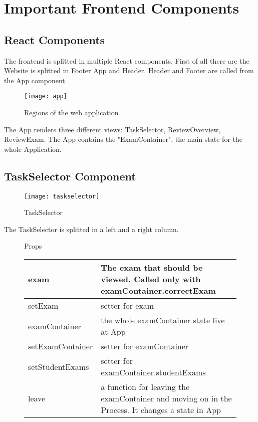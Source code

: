 \author{Paul Hoffmann}
\graphicspath{ {./src/chapters/developer/media/} }

\chapter{Important Frontend Components}
\section{React Components}
The frontend is splitted in multiple React components.
First of all there are the Website is splitted in Footer App and Header.
Header and Footer are called from the App component\\

\begin{figure}[H]
    \centering
    \texttt{[image: app]}
    \caption{Regions of the web application} %
\end{figure}

The App renders three different views: TaskSelector, ReviewOverview, ReviewExam.
The App contains the "ExamContainer", the main state for the whole Application.

\section{TaskSelector Component}
\begin{figure}[H]
    \centering
    \texttt{[image: taskselector]}
    \caption{TaskSelector}
\end{figure}

The TaskSelector is splitted in a left and a right column.

\begin{figure}[H]
Props\\
    \begin{tabularx}{\textwidth}{|l|X|} 
    \hline
    exam & The exam that should be viewed. Called only with
    examContainer.correctExam \\
    \hline
    setExam & setter for exam \\
    \hline
    examContainer & the whole examContainer state live at App\\
    \hline
    setExamContainer & setter for examContainer \\
    \hline
    setStudentExams & setter for examContainer.studentExams \\
    \hline
    leave & a function for leaving the examContainer and moving on in
    the Process. It changes a state in App \\
    \hline
    \end{tabularx}
\end{figure}

